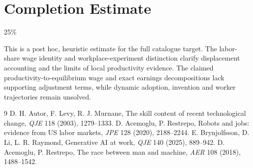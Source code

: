\documentclass[11pt]{article}
\theoremstyle{definition}
\begin{document}
\section{Completion Estimate}
25\%

This is a post hoc, heuristic estimate for the full catalogue target.
The labor-share wage identity and workplace-experiment distinction clarify displacement accounting and the limits of local productivity evidence. The claimed productivity-to-equilibrium wage and exact earnings decompositions lack supporting adjustment terms, while dynamic adoption, invention and worker trajectories remain unsolved.

\begin{thebibliography}{9}
 D. H. Autor, F. Levy, R. J. Murnane, The skill content of recent technological change, \emph{QJE} 118 (2003), 1279--1333.
 D. Acemoglu, P. Restrepo, Robots and jobs: evidence from US labor markets, \emph{JPE} 128 (2020), 2188--2244.
 E. Brynjolfsson, D. Li, L. R. Raymond, Generative AI at work, \emph{QJE} 140 (2025), 889--942.
 D. Acemoglu, P. Restrepo, The race between man and machine, \emph{AER} 108 (2018), 1488--1542.
\end{thebibliography}
\end{document}

